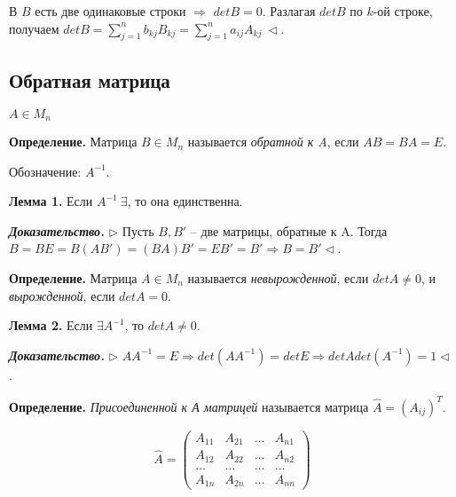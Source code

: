 В $B$ есть две одинаковые строки $\Rightarrow$ $detB = 0$. Разлагая $detB$ по $k$-ой строке, получаем $detB = \sum\limits_{j = 1}^n b_{kj}B_{kj} = \sum\limits_{j = 1}^n a_{ij}A_{kj} \ \lhd$.

\vspace{\baselineskip}
\subsection{Обратная матрица}

$A \in M_n$

\vspace{\baselineskip}
\textbf{Определение.} Матрица $B \in M_n$ называется \textit{обратной к A}, если $AB = BA = E$.

Обозначение: $A^{-1}$.

\vspace{\baselineskip}
\textbf{Лемма 1.} Если $A^{-1} \ \exists$, то она единственна.

\vspace{\baselineskip}
\textbf{\textit{Доказательство.}} $\rhd$ Пусть $B, B'$ -- две матрицы, обратные к A. Тогда $B = BE = B(AB') = (BA)B' = EB' = B' \Rightarrow B = B' \lhd$.

\vspace{\baselineskip}
\textbf{Определение.} Матрица $A \in M_n$ называется \textit{невырожденной}, если $detA \neq 0$, и \textit{вырожденной}, если $detA = 0$.

\vspace{\baselineskip}
\textbf{Лемма 2.} Если $\exists A^{-1}$, то $detA \neq 0$.

\vspace{\baselineskip}
\textbf{\textit{Доказательство.}} $\rhd$ $AA^{-1} = E \Rightarrow det(AA^{-1}) = detE \Rightarrow detA det(A^{-1}) = 1 \lhd$.

\vspace{\baselineskip}
\textbf{Определение.} \textit{Присоединенной к А матрицей} называется матрица $\widehat{A} = (A_{ij})^T$.

\vspace{\baselineskip}
\[\widehat{A} = \begin{pmatrix} A_{11} & A_{21} & \dots & A_{n1} \\ A_{12} & A_{22} & \dots & A_{n2} \\ \dots & \dots & \dots & \dots \\ A_{1n} & A_{2n} & \dots & A_{nn} \end{pmatrix}
\]

